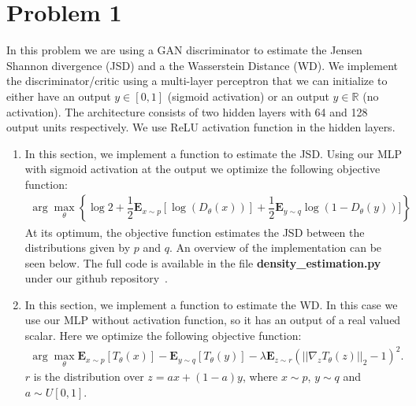 \section*{Problem 1}
In this problem we are using a GAN discriminator to estimate the Jensen Shannon divergence (JSD) and a the Wasserstein Distance (WD). We implement the discriminator/critic using a multi-layer perceptron that we can initialize to either have an output $y\in[0,1]$ (sigmoid activation) or an output $y\in\mathbb{R}$ (no activation). The architecture consists of two hidden layers with 64 and 128 output units respectively. We use ReLU activation function in the hidden layers.

\begin{enumerate}
	\item In this section, we implement a function to estimate the JSD. Using our MLP with sigmoid activation at the output we optimize the following objective function: 
	\begin{align*}
     \arg\max_{\theta}\left\{ \log2 + \dfrac{1}{2}\mathbf{E}_{x\sim p}[\log(D_\theta (x))] + \dfrac{1}{2}\mathbf{E}_{y\sim q}\log(1-D_\theta (y))]\right\}
	\end{align*}
	At its optimum, the objective function estimates the JSD between the distributions given by $p$ and $q$.
%	
%
	An overview of the implementation can be seen below. The full code is available in the file \textbf{density\_estimation.py} under our github repository~\cite{github}.
	
	
	
	\item In this section, we implement a function to estimate the WD. In this case we use our MLP without activation function, so it has an output of a real valued scalar. Here we optimize the following objective function:
	\begin{align*}
	    \arg\max_\theta \mathbf{E}_{x\sim p}[T_\theta(x)]-\mathbf{E}_{y\sim q}[T_\theta(y)] - \lambda \mathbf{E}_{z\sim r} (||\nabla_z T_\theta(z)||_2 - 1)^2.
	\end{align*}
	 $r$ is the distribution over $z=ax+(1-a)y$, where $x\sim p$, $y\sim q$ and $a\sim U[0,1]$.
	 

\end{enumerate}
